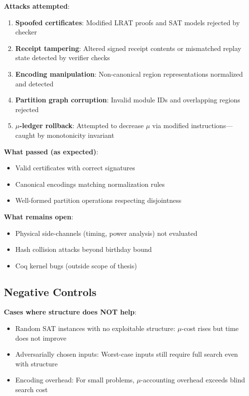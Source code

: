 \begin{tcolorbox}[thesisbox,colback=red!5!white,colframe=red!75!black,title=What Attacks Were Tested]
\textbf{Attacks attempted}:
\begin{enumerate}
    \item \textbf{Spoofed certificates}: Modified LRAT proofs and SAT models rejected by checker
    \item \textbf{Receipt tampering}: Altered signed receipt contents or mismatched replay state detected by verifier checks
    \item \textbf{Encoding manipulation}: Non-canonical region representations normalized and detected
    \item \textbf{Partition graph corruption}: Invalid module IDs and overlapping regions rejected
    \item \textbf{$\mu$-ledger rollback}: Attempted to decrease $\mu$ via modified instructions---caught by monotonicity invariant
\end{enumerate}

\textbf{What passed (as expected)}:
\begin{itemize}
    \item Valid certificates with correct signatures
    \item Canonical encodings matching normalization rules
    \item Well-formed partition operations respecting disjointness
\end{itemize}

\textbf{What remains open}:
\begin{itemize}
    \item Physical side-channels (timing, power analysis) not evaluated
    \item Hash collision attacks beyond birthday bound
    \item Coq kernel bugs (outside scope of thesis)
\end{itemize}
\end{tcolorbox}

\subsection{Negative Controls}

\textbf{Cases where structure does NOT help}:
\begin{itemize}
    \item Random SAT instances with no exploitable structure: $\mu$-cost rises but time does not improve
    \item Adversarially chosen inputs: Worst-case inputs still require full search even with structure
    \item Encoding overhead: For small problems, $\mu$-accounting overhead exceeds blind search cost
\end{itemize}

